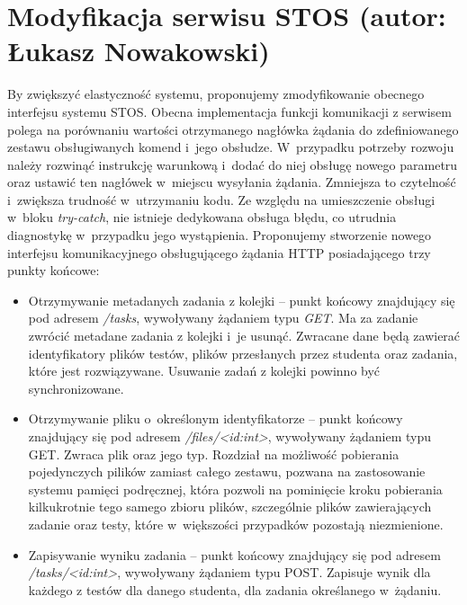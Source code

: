 \section{Modyfikacja serwisu STOS (autor: Łukasz Nowakowski)}
By zwiększyć elastyczność systemu, proponujemy zmodyfikowanie obecnego interfejsu systemu STOS. Obecna implementacja funkcji komunikacji z serwisem polega na porównaniu wartości otrzymanego nagłówka żądania do zdefiniowanego zestawu obsługiwanych komend i~jego obsłudze. W~przypadku potrzeby rozwoju należy rozwinąć instrukcję warunkową i~dodać do niej obsługę nowego parametru oraz ustawić ten nagłówek w~miejscu wysyłania żądania. Zmniejsza to czytelność i~zwiększa trudność w~utrzymaniu kodu. Ze względu na umieszczenie obsługi w~bloku \textit{try-catch}, nie istnieje dedykowana obsługa błędu, co utrudnia diagnostykę w~przypadku jego wystąpienia. Proponujemy stworzenie nowego interfejsu komunikacyjnego obsługującego żądania HTTP posiadającego trzy punkty końcowe:
\begin{itemize}
    \item Otrzymywanie metadanych zadania z kolejki -- punkt końcowy znajdujący się pod adresem \textit{/tasks}, wywoływany żądaniem typu \textit{GET}. Ma za zadanie zwrócić metadane zadania z kolejki i~je usunąć. Zwracane dane będą zawierać identyfikatory plików testów, plików przesłanych przez studenta oraz zadania, które jest rozwiązywane. Usuwanie zadań z kolejki powinno być synchronizowane.
    \item Otrzymywanie pliku o~określonym identyfikatorze -- punkt końcowy znajdujący się pod adresem \textit{/files/<id:int>}, wywoływany żądaniem typu GET. Zwraca plik oraz jego typ. Rozdział na możliwość pobierania pojedynczych pilików zamiast całego zestawu, pozwana na zastosowanie systemu pamięci podręcznej, która pozwoli na pominięcie kroku pobierania kilkukrotnie tego samego zbioru plików, szczególnie plików zawierających zadanie oraz testy, które w~większości przypadków pozostają niezmienione.
    \item Zapisywanie wyniku zadania -- punkt końcowy znajdujący się pod adresem \textit{/tasks/<id:int>}, wywoływany żądaniem typu POST. Zapisuje wynik dla każdego z testów dla danego studenta, dla zadania określanego w~żądaniu.
\end{itemize}

